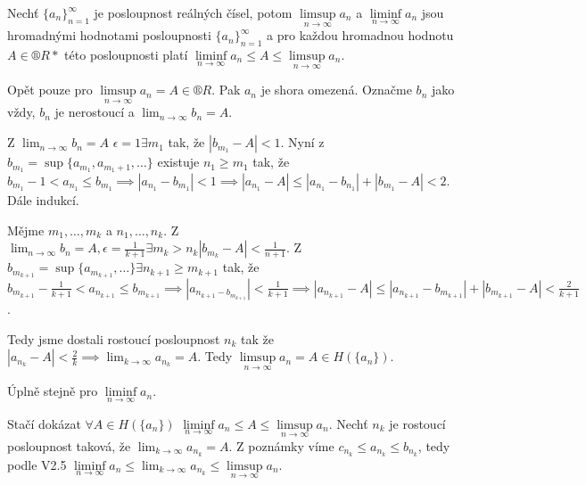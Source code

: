 \documentclass[12pt]{article}					%
\begin{document}
        \begin{veta}
            Nechť $\{a_n\}_{n = 1}^∞$ je posloupnost reálných čísel, potom $\limsup\limits_{n \rightarrow ∞} a_n$ a $\liminf\limits_{n \rightarrow ∞} a_n$ jsou hromadnými hodnotami posloupnosti $\{a_n\}_{n = 1}^∞$ a pro každou hromadnou hodnotu $A \in ®R*$ této posloupnosti platí $\liminf\limits_{n \rightarrow ∞} a_n ≤ A ≤ \limsup\limits_{n \rightarrow ∞} a_n$.
            \begin{dukazin}
                Opět pouze pro $\limsup\limits_{n \rightarrow ∞} a_n = A \in ®R$. Pak $a_n$ je shora omezená. Označme $b_n$ jako vždy, $b_n$ je nerostoucí a $\lim_{n \rightarrow ∞} b_n = A$.

                Z $\lim_{n \rightarrow ∞} b_n = A$ $\epsilon = 1 \exists m_1$ tak, že $|b_{m_1} - A|<1$. Nyní z $b_{m_1} = \sup\{a_{m_1}, a_{m_1 + 1}, …\}$ existuje $n_1 ≥ m_1$ tak, že $b_{m_1} - 1 < a_{n_1} ≤ b_{m_1} \implies |a_{n_1} - b_{m_1}| < 1 \implies |a_{n_{1}} - A|≤|a_{n_1} - b_{n_1}| + |b_{m_1} - A| < 2$. Dále indukcí.

                Mějme $m_1, …, m_k$ a $n_1, …, n_k$. Z $\lim_{n \rightarrow ∞} b_n = A, \epsilon = \frac{1}{k+1} \exists m_k > n_k |b_{m_k} - A| < \frac{1}{n+1}$. Z $b_{m_{k+1}} = \sup\{ a_{m_{k+1}}, … \} \exists n_{k+1} ≥ m_{k+1}$ tak, že $b_{m_{k+1}} - \frac{1}{k+1} < a_{n_{k+1}} ≤ b_{m_{k+1}} \implies |a_{n_{k+1} - b_{m_{k+1}}}|<\frac{1}{k+1} \implies |a_{n_{k+1}} - A|≤|a_{n_{k+1}} - b_{m_{k+1}}| + |b_{m_{k+1}}-A| < \frac{2}{k+1}$.
                
                Tedy jsme dostali rostoucí posloupnost $n_k$ tak že $|a_{n_k} - A| < \frac{2}{k} \implies \lim_{k \rightarrow ∞} a_{n_k} = A$. Tedy $\limsup\limits_{n \rightarrow ∞} a_n = A \in H(\{a_n\})$.

                Úplně stejně pro $\liminf\limits_{n \rightarrow ∞} a_n$.

                Stačí dokázat $\forall A \in H(\{a_n\})$ $\liminf\limits_{n \rightarrow ∞} a_n ≤ A ≤ \limsup\limits_{n \rightarrow ∞} a_n$. Nechť $n_k$ je rostoucí posloupnost taková, že $\lim_{k \rightarrow ∞} a_{n_k} = A$. Z poznámky víme $c_{n_k} ≤ a_{n_k} ≤ b_{n_k}$, tedy podle V2.5 $\liminf\limits_{n \rightarrow ∞} a_n ≤ \lim_{k \rightarrow ∞} a_{n_k} ≤ \limsup\limits_{n \rightarrow ∞} a_n$.

            \end{dukazin}
        \end{veta}
\end{document}

